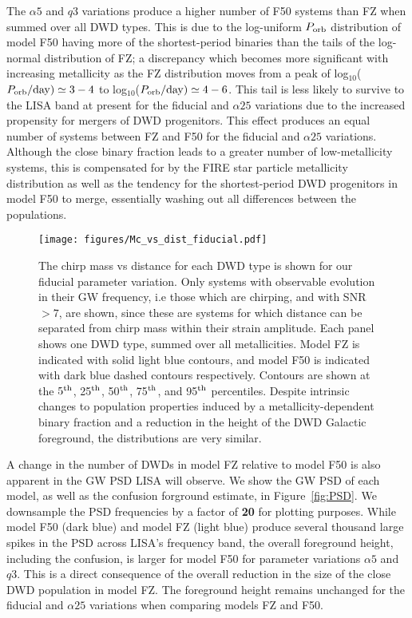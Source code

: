 \documentclass[twocolumn, linenumbers]{aastex631}
\begin{document}
The $\alpha5$ and $q3$ variations produce a higher number of F50 systems than FZ when summed over all DWD types. This is due to the log-uniform $P_{\rm{orb}}$ distribution of model F50 having more of the shortest-period binaries than the tails of the log-normal distribution of FZ; a discrepancy which becomes more significant with increasing metallicity as the FZ distribution moves from a peak of log$_{10}$($P_{\rm{orb}}\rm{/day})\simeq 3-4$ to log$_{10}$($P_{\rm{orb}}\rm{/day})\simeq 4-6$. This tail is less likely to survive to the LISA band at present for the fiducial and $\alpha25$ variations due to the increased propensity for mergers of DWD progenitors. This effect produces an equal number of systems between FZ and F50 for the fiducial and $\alpha25$ variations. Although the close binary fraction leads to a greater number of low-metallicity systems, this is compensated for by the FIRE star particle metallicity distribution as well as the tendency for the shortest-period DWD progenitors in model F50 to merge, essentially washing out all differences between the populations.

\begin{figure*}
	\texttt{[image: figures/Mc\_vs\_dist\_fiducial.pdf]}
    \caption{The chirp mass vs distance for each DWD type is shown for our fiducial parameter variation. Only systems with observable evolution in their GW frequency, i.e those which are chirping, and with SNR $>7$, are shown, since these are systems for which distance can be separated from chirp mass within their strain amplitude. Each panel shows one DWD type, summed over all metallicities. Model FZ is indicated with solid light blue contours, and model F50 is indicated with dark blue dashed contours respectively. Contours are shown at the $5^{\rm{th}}$, 25$^{\rm{th}}$, 50$^{\rm{th}}$, 75$^{\rm{th}}$, and 95$^{\rm{th}}$ percentiles. Despite intrinsic changes to population properties induced by a metallicity-dependent binary fraction and a reduction in the height of the DWD Galactic foreground, the distributions are very similar.}
    \label{fig:Mc_vs_dist}
\end{figure*}

A change in the number of DWDs in model FZ relative to model F50 is also apparent in the GW PSD LISA will observe. We show the GW PSD of each model, as well as the confusion forground estimate, in Figure~\ref{fig:PSD}. We downsample the PSD frequencies by a factor of \textbf{20} for plotting purposes. While model F50 (dark blue) and model FZ (light blue) produce several thousand large spikes in the PSD across LISA's frequency band, the overall foreground height, including the confusion, is larger for model F50 for parameter variations $\alpha5$ and $q3$. This is a direct consequence of the overall reduction in the size of the close DWD population in model FZ. The foreground height remains unchanged for the fiducial and $\alpha25$ variations when comparing models FZ and F50.
\end{document}
